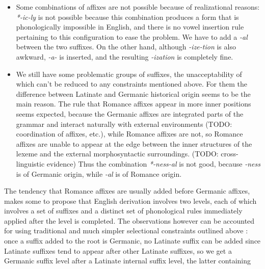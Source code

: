 \documentclass[UTF8, a4paper, oneside, scheme=plain, 12pt]{ctexbook}
\newcommand{\form}[1]{\emph{#1}}
\begin{document}
\begin{itemize}
    \item Some combinations of affixes are not possible because of realizational reasons:
    \form{*-ic-ly} is not possible 
    because this combination produces a form 
    that is phonologically impossible in English,
    and there is no vowel insertion rule pertaining to this configuration to ease the problem.
    We have to add a \form{-al} between the two suffixes.
    On the other hand, although \form{-ize-tion} is also awkward,
    \form{-a-} is inserted, and the resulting \form{-ization} is completely fine.
    \item We still have some problematic groups of suffixes,
    the unacceptability of which can't be reduced to any constraints mentioned above.
    For them the difference
    between Latinate and Germanic historical origin 
    seems to be the main reason.
    The rule that Romance affixes appear in more inner positions seems expected,
    because the Germanic affixes are integrated parts of the grammar 
    and interact naturally with external environments
    (TODO: coordination of affixes, etc.),
    while Romance affixes are not,
    so Romance affixes are unable to appear at the edge 
    between the inner structures of the lexeme and the external morphosyntactic surroundings.
    (TODO: cross-linguistic evidence)
    Thus the combination \form{*-ness-al} is not good,
    because \form{-ness} is of Germanic origin,
    while \form{-al} is of Romance origin.
\end{itemize}

The tendency that Romance affixes are usually added before Germanic affixes,
makes some to propose that English derivation 
involves two levels, 
each of which involves a set of suffixes 
and a distinct set of phonological rules immediately applied after the level is completed.
The observations however can be accounted for 
using traditional and much simpler selectional constraints outlined above \citep{fabb1988english}:
once a suffix added to the root is Germanic,
no Latinate suffix can be added 
since Latinate suffixes tend to appear after other Latinate suffixes,
so we get a Germanic suffix level after a Latinate internal suffix level,
the latter containing 
\end{document}
